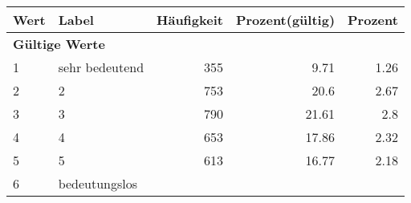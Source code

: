      \begin{longtable}{lXrrr}
     \toprule
     \textbf{Wert} & \textbf{Label} & \textbf{Häufigkeit} & \textbf{Prozent(gültig)} & \textbf{Prozent} \\
     \endhead
     \midrule
     \multicolumn{5}{l}{\textbf{Gültige Werte}}\\

     1 &
     \multicolumn{1}{X}{ sehr bedeutend   } &


       \num{355} &
       \num[round-mode=places,round-precision=2]{9,71} &
         \num[round-mode=places,round-precision=2]{1,26} \\

     2 &
     \multicolumn{1}{X}{ 2   } &


       \num{753} &
       \num[round-mode=places,round-precision=2]{20,6} &
         \num[round-mode=places,round-precision=2]{2,67} \\

     3 &
     \multicolumn{1}{X}{ 3   } &


       \num{790} &
       \num[round-mode=places,round-precision=2]{21,61} &
         \num[round-mode=places,round-precision=2]{2,8} \\

     4 &
     \multicolumn{1}{X}{ 4   } &


       \num{653} &
       \num[round-mode=places,round-precision=2]{17,86} &
         \num[round-mode=places,round-precision=2]{2,32} \\

     5 &
     \multicolumn{1}{X}{ 5   } &


       \num{613} &
       \num[round-mode=places,round-precision=2]{16,77} &
         \num[round-mode=places,round-precision=2]{2,18} \\

     6 &
     \multicolumn{1}{X}{ bedeutungslos   } &



\end{longtable}
